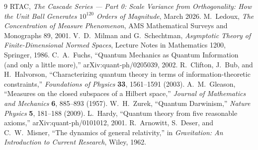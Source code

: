 \documentclass[12pt,a4paper]{article}
\begin{document}
\begin{thebibliography}{9}
 RTAC, \emph{The Cascade Series --- Part 0: Scale Variance from
Orthogonality: How the Unit Ball Generates $10^{120}$ Orders of Magnitude}, March 2026.
 M.~Ledoux, \emph{The Concentration of Measure Phenomenon}, AMS
Mathematical Surveys and Monographs 89, 2001.
 V.~D.~Milman and G.~Schechtman, \emph{Asymptotic Theory of
Finite-Dimensional Normed Spaces}, Lecture Notes in Mathematics 1200, Springer, 1986.
 C.~A.~Fuchs, ``Quantum Mechanics as Quantum Information (and only a little
more),'' arXiv:quant-ph/0205039, 2002.
 R.~Clifton, J.~Bub, and H.~Halvorson, ``Characterizing quantum theory in
terms of information-theoretic constraints,'' \emph{Foundations of Physics} \textbf{33},
1561--1591 (2003).
 A.~M.~Gleason, ``Measures on the closed subspaces of a Hilbert space,''
\emph{Journal of Mathematics and Mechanics} \textbf{6}, 885--893 (1957).
 W.~H.~Zurek, ``Quantum Darwinism,'' \emph{Nature Physics} \textbf{5},
181--188 (2009).
 L.~Hardy, ``Quantum theory from five reasonable axioms,''
arXiv:quant-ph/0101012, 2001.
 R.~Arnowitt, S.~Deser, and C.~W.~Misner, ``The dynamics of general
relativity,'' in \emph{Gravitation: An Introduction to Current Research}, Wiley, 1962.
\end{thebibliography}
\end{document}
